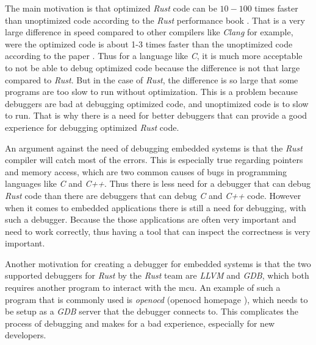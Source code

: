 


The main motivation is that optimized \emph{Rust} code can be $10-100$ times faster than unoptimized code according to the \emph{Rust} performance book \cite{perf-book}.
That is a very large difference in speed compared to other compilers like \emph{Clang} for example, were the optimized code is about 1-3 times faster than the unoptimized code according to the paper \cite{clang-opt}.
Thus for a language like \emph{C}, it is much more acceptable to not be able to debug optimized code because the difference is not that large compared to \emph{Rust}.
But in the case of \emph{Rust}, the difference is so large that some programs are too slow to run without optimization.
This is a problem because debuggers are bad at debugging optimized code, and unoptimized code is to slow to run.
That is why there is a need for better debuggers that can provide a good experience for debugging optimized \emph{Rust} code.


An argument against the need of debugging embedded systems is that the \emph{Rust} compiler will catch most of the errors.
This is especially true regarding pointers and memory access, which are two common causes of bugs in programming languages like \emph{C} and \emph{C++}. 
Thus there is less need for a debugger that can debug \emph{Rust} code than there are debuggers that can debug \emph{C} and \emph{C++} code.
However when it comes to embedded applications there is still a need for debugging, with such a debugger.
Because the those applications are often very important and need to work correctly, thus having a tool that can inspect the correctness is very important.


Another motivation for creating a debugger for embedded systems is that the two supported debuggers for \emph{Rust} by the \emph{Rust} team are \emph{LLVM} and \emph{GDB}, which both requires another program to interact with the \gls{mcu}.
An example of such a program that is commonly used is \emph{openocd} (openocd homepage \cite{openocd}), which needs to be setup as a \emph{GDB} server that the debugger connects to.
This complicates the process of debugging and makes for a bad experience, especially for new developers.


